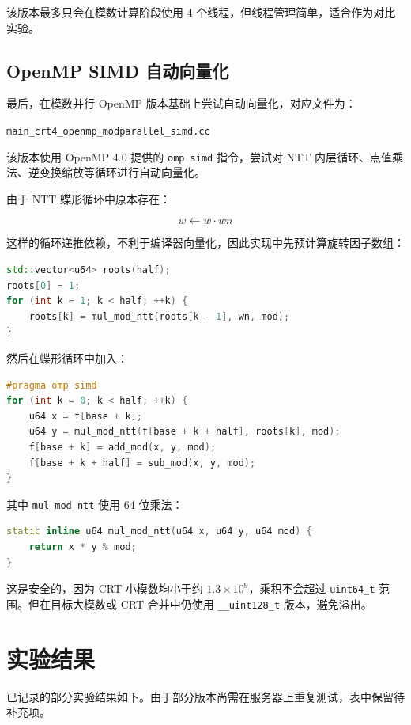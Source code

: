 \documentclass[UTF8,a4paper,12pt]{ctexart}
\begin{document}
该版本最多只会在模数计算阶段使用 4 个线程，但线程管理简单，适合作为对比实验。

\subsection{OpenMP SIMD 自动向量化}

最后，在模数并行 OpenMP 版本基础上尝试自动向量化，对应文件为：

\begin{center}
\texttt{main\_crt4\_openmp\_modparallel\_simd.cc}
\end{center}

该版本使用 OpenMP 4.0 提供的 \texttt{omp simd} 指令，尝试对 NTT 内层循环、点值乘法、逆变换缩放等循环进行自动向量化。

由于 NTT 蝶形循环中原本存在：

\[
w \leftarrow w \cdot wn
\]

这样的循环递推依赖，不利于编译器向量化，因此实现中先预计算旋转因子数组：

\begin{lstlisting}[language=C++]
std::vector<u64> roots(half);
roots[0] = 1;
for (int k = 1; k < half; ++k) {
    roots[k] = mul_mod_ntt(roots[k - 1], wn, mod);
}
\end{lstlisting}

然后在蝶形循环中加入：

\begin{lstlisting}[language=C++]
#pragma omp simd
for (int k = 0; k < half; ++k) {
    u64 x = f[base + k];
    u64 y = mul_mod_ntt(f[base + k + half], roots[k], mod);
    f[base + k] = add_mod(x, y, mod);
    f[base + k + half] = sub_mod(x, y, mod);
}
\end{lstlisting}

其中 \texttt{mul\_mod\_ntt} 使用 64 位乘法：

\begin{lstlisting}[language=C++]
static inline u64 mul_mod_ntt(u64 x, u64 y, u64 mod) {
    return x * y % mod;
}
\end{lstlisting}

这是安全的，因为 CRT 小模数均小于约 \(1.3\times 10^9\)，乘积不会超过 \texttt{uint64\_t} 范围。但在目标大模数或 CRT 合并中仍使用 \texttt{\_\_uint128\_t} 版本，避免溢出。

\section{实验结果}

已记录的部分实验结果如下。由于部分版本尚需在服务器上重复测试，表中保留待补充项。
\end{document}
